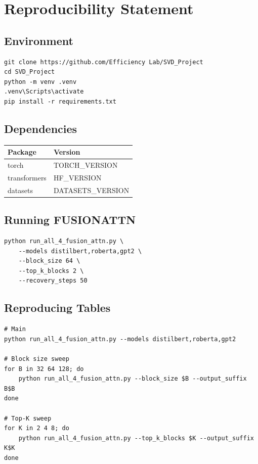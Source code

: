 \section{Reproducibility Statement}

\subsection{Environment}

\begin{lstlisting}
git clone https://github.com/Efficiency Lab/SVD_Project
cd SVD_Project
python -m venv .venv
.venv\Scripts\activate
pip install -r requirements.txt
\end{lstlisting}

\subsection{Dependencies}

\begin{table}[H]
\centering
\small
\begin{tabular}{ll}
\toprule
\textbf{Package} & \textbf{Version} \\
\midrule
torch & {{TORCH\_VERSION}} \\
transformers & {{HF\_VERSION}} \\
datasets & {{DATASETS\_VERSION}} \\
\bottomrule
\end{tabular}
\end{table}

\subsection{Running FUSIONATTN}

\begin{lstlisting}
python run_all_4_fusion_attn.py \
    --models distilbert,roberta,gpt2 \
    --block_size 64 \
    --top_k_blocks 2 \
    --recovery_steps 50
\end{lstlisting}

\subsection{Reproducing Tables}

\begin{lstlisting}
# Main
python run_all_4_fusion_attn.py --models distilbert,roberta,gpt2

# Block size sweep
for B in 32 64 128; do
    python run_all_4_fusion_attn.py --block_size $B --output_suffix B$B
done

# Top-K sweep
for K in 2 4 8; do
    python run_all_4_fusion_attn.py --top_k_blocks $K --output_suffix K$K
done
\end{lstlisting}

